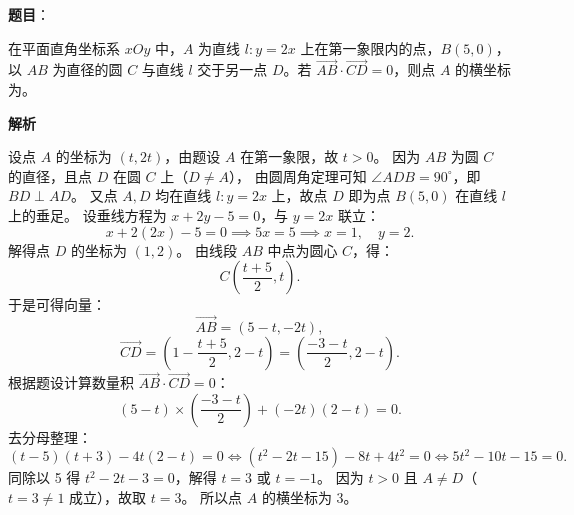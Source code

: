 \begin{answer}

\textbf{题目}：

在平面直角坐标系 $xOy$ 中，$A$ 为直线 $l: y = 2x$ 上在第一象限内的点，$B(5, 0)$，以 $AB$ 为直径的圆 $C$ 与直线 $l$ 交于另一点 $D$。若 $\overrightarrow{AB} \cdot \overrightarrow{CD} = 0$，则点 $A$ 的横坐标为\gkblank{}。

\textbf{解析}

设点 $A$ 的坐标为 $(t, 2t)$，由题设 $A$ 在第一象限，故 $t > 0$。
因为 $AB$ 为圆 $C$ 的直径，且点 $D$ 在圆 $C$ 上（$D \ne A$），
由圆周角定理可知 $\angle ADB = 90^\circ$，即 $BD \perp AD$。
又点 $A, D$ 均在直线 $l: y = 2x$ 上，故点 $D$ 即为点 $B(5, 0)$ 在直线 $l$ 上的垂足。
设垂线方程为 $x + 2y - 5 = 0$，与 $y = 2x$ 联立：
\nopagebreak[4]
\[x + 2(2x) - 5 = 0 \implies 5x = 5 \implies x = 1, \quad y = 2.\]
解得点 $D$ 的坐标为 $(1, 2)$。
由线段 $AB$ 中点为圆心 $C$，得：
\nopagebreak[4]
\[C\left(\frac{t + 5}{2}, t\right).\]
于是可得向量：
\nopagebreak[4]
\[\overrightarrow{AB} = (5 - t, -2t),\]
\nopagebreak[4]
\[\overrightarrow{CD} = \left(1 - \frac{t + 5}{2}, 2 - t\right) = \left(\frac{-3 - t}{2}, 2 - t\right).\]
根据题设计算数量积 $\overrightarrow{AB} \cdot \overrightarrow{CD} = 0$：
\nopagebreak[4]
\[(5 - t) \times \left(\frac{-3 - t}{2}\right) + (-2t)(2 - t) = 0.\]
去分母整理：
\nopagebreak[4]
\[(t - 5)(t + 3) - 4t(2 - t) = 0 \iff (t^2 - 2t - 15) - 8t + 4t^2 = 0 \iff 5t^2 - 10t - 15 = 0.\]
同除以 5 得 $t^2 - 2t - 3 = 0$，解得 $t = 3$ 或 $t = -1$。
因为 $t > 0$ 且 $A \ne D$（$t = 3 \ne 1$ 成立），故取 $t = 3$。
所以点 $A$ 的横坐标为 $3$。


\end{answer}
